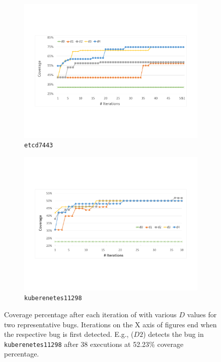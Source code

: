 \begin{figure}
     \centering
     \begin{subfigure}[b]{0.46\textwidth}
        \centering
        \includegraphics[width=\textwidth]{goat/figs/coverage_etcd7443.pdf}
        \caption{\texttt{etcd7443}}
        \label{fig:etcd_coverage}
     \end{subfigure}
     \hfill
     \begin{subfigure}[b]{0.46\textwidth}
       \centering
       \includegraphics[width=\textwidth]{goat/figs/coverage_kubernetes11298.pdf}
       \caption{\texttt{kuberenetes11298}}
       \label{fig:kubernetes_coverage}
     \end{subfigure}
        \caption{Coverage percentage after each iteration of \goat with various $D$ values for two representative bugs. Iterations on the X axis of figures end when the respective bug is first detected. E.g., \goat($D2$) detects the bug in \texttt{kuberenetes11298} after 38 executions at 52.23\% coverage percentage.}
        \label{fig:coverage}
\end{figure}



